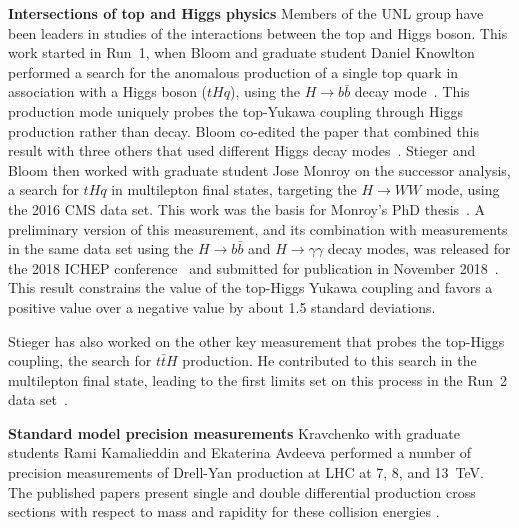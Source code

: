 {\bf Intersections of top and Higgs physics} Members of the UNL group have been leaders in studies of the interactions between the top and Higgs boson.  This work started in Run~1, when Bloom and graduate student Daniel Knowlton performed a search for the anomalous production of a single top quark in association with a Higgs boson ($tHq$), using the $H \to b\bar{b}$ decay mode~\cite{bib:tHqbbPAS}.  This production mode uniquely probes the top-Yukawa coupling through Higgs production rather than decay.  Bloom co-edited the paper that combined this result with three others that used different Higgs decay modes~\cite{bib:tHqRun1}.  Stieger and Bloom then worked with graduate student Jose Monroy on the successor analysis, a search for $tHq$ in multilepton final states, targeting the $H \to WW$ mode, using the 2016 CMS data set.  This work was the basis for Monroy's PhD thesis~\cite{bib:monroy_thesis}.  A preliminary version of this measurement, and its combination with measurements in the same data set using the $H\to b\bar{b}$ and $H \to \gamma\gamma$ decay modes, was released for the 2018 ICHEP conference~\cite{bib:tHqRun2PAS} and submitted for publication in November 2018~\cite{bib:tHqRun2}.  This result constrains the value of the top-Higgs Yukawa coupling and favors a positive value over a negative value by about 1.5 standard deviations.

Stieger has also worked on the other key measurement that probes the top-Higgs
coupling, the search for $t\bar{t}H$ production.  He contributed to
this search in the multilepton final state, leading to the first limits set
on this process in the Run~2 data set~\cite{bib:ttHmultilep}.

{\bf Standard model precision measurements} Kravchenko with graduate students Rami Kamalieddin and Ekaterina Avdeeva performed a number of precision measurements of Drell-Yan production at LHC at 7, 8, and 13~TeV. The published papers present single and double differential production cross sections with respect to mass and rapidity for these collision energies \cite{bib:DY7,bib:DY8,bib:DY13}.


